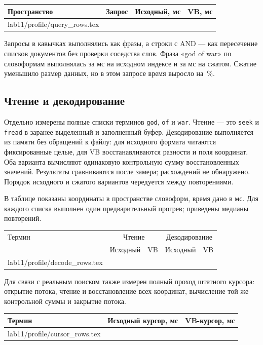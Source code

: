 \documentclass[12pt,a4paper]{article}
\makeatletter
\newcommand{\inputrows}[1]{\@@input #1 }
\makeatother
\begin{document}
\begin{center}
\small
\begin{tabular}{@{}llrr@{}}
\toprule
Пространство & Запрос & Исходный, мс & VB, мс\\
\midrule
\inputrows{lab11/profile/query_rows.tex}
\bottomrule
\end{tabular}
\end{center}
Запросы в кавычках выполнялись как фразы, а строки с AND --- как
пересечение списков документов без проверки соседства слов.
Фраза «god of war» по словоформам выполнялась за \ProfileGodRaw{} мс
на исходном индексе и за \ProfileGodVB{} мс на сжатом.
Сжатие уменьшило размер данных, но в этом запросе время выросло
на \ProfileGodSlower\,\%.

\subsection{Чтение и декодирование}
Отдельно измерены полные списки терминов \texttt{god}, \texttt{of} и
\texttt{war}. Чтение --- это \texttt{seek} и \texttt{fread} в заранее
выделенный и заполненный буфер. Декодирование выполняется из памяти без
обращений к файлу: для исходного формата читаются фиксированные целые,
для VB восстанавливаются разности и поля координат. Оба варианта вычисляют
одинаковую контрольную сумму восстановленных значений.
Результаты сравниваются после замера; расхождений не обнаружено.
Порядок исходного и сжатого вариантов чередуется между повторениями.

В таблице показаны координаты в пространстве словоформ, время дано в мс.
Для каждого списка выполнен один предварительный прогрев; приведены
медианы \ProfileRepeats{} повторений.
\begin{center}
\begin{tabular}{@{}lrrrr@{}}
\toprule
Термин & \multicolumn{2}{c}{Чтение} & \multicolumn{2}{c}{Декодирование}\\
 & Исходный & VB & Исходный & VB\\
\midrule
\inputrows{lab11/profile/decode_rows.tex}
\bottomrule
\end{tabular}
\end{center}

Для связи с реальным поиском также измерен полный проход штатного курсора:
открытие потока, чтение и восстановление всех координат, вычисление той же
контрольной суммы и закрытие потока.
\begin{center}
\begin{tabular}{@{}lrr@{}}
\toprule
Термин & Исходный курсор, мс & VB-курсор, мс\\
\midrule
\inputrows{lab11/profile/cursor_rows.tex}
\bottomrule
\end{tabular}
\end{center}
\end{document}
